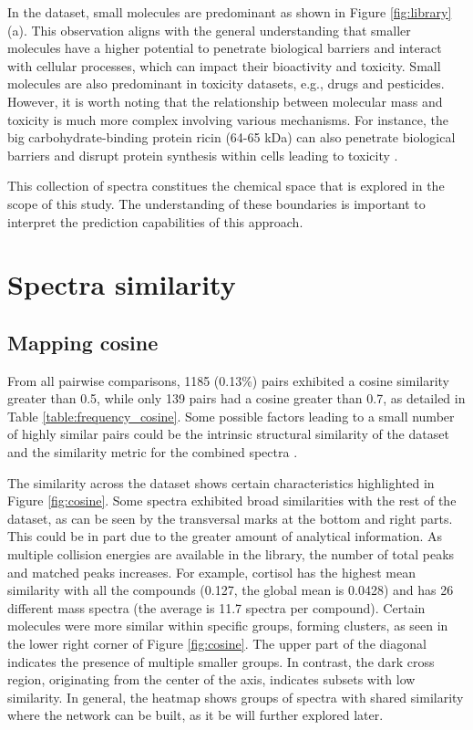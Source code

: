 In the dataset, small molecules are predominant as shown in Figure \ref{fig:library} (a). This observation aligns with the general understanding that smaller molecules have a higher potential to penetrate biological barriers and interact with cellular processes, which can impact their bioactivity and toxicity. Small molecules are also predominant in toxicity datasets, e.g., drugs and pesticides. However, it is worth noting that the relationship between molecular mass and toxicity is much more complex involving various mechanisms. For instance, the big carbohydrate-binding protein ricin (64-65 kDa) can also penetrate biological barriers and disrupt protein synthesis within cells leading to toxicity \cite{SANDVIG2000415}. 

This collection of spectra constitues the chemical space that is explored in the scope of this study. The understanding of these boundaries is important to interpret the prediction capabilities of this approach.


\section*{Spectra similarity}


\subsection*{Mapping cosine}
From all pairwise comparisons, 1185 (0.13\%) pairs exhibited a cosine similarity greater than 0.5, while only 139 pairs had a cosine greater than 0.7, as detailed in Table \ref{table:frequency_cosine}. Some possible factors leading to a small number of highly similar pairs could be the intrinsic structural similarity of the dataset and the similarity metric for the combined spectra .  

The similarity across the dataset shows certain characteristics highlighted in Figure \ref{fig:cosine}. Some spectra exhibited broad similarities with the rest of the dataset, as can be seen by the transversal marks at the bottom and right  parts. This could be in part due to the greater amount of analytical information. As multiple collision energies are available in the library, the number of total peaks and matched peaks increases. For example, cortisol has the highest mean similarity with all the compounds (0.127, the global mean is 0.0428) and has 26 different mass spectra (the average is 11.7 spectra per compound). Certain molecules were more similar within specific groups, forming clusters, as seen in the lower right corner of Figure \ref{fig:cosine}. The upper part of the diagonal indicates the presence of multiple smaller groups. In contrast, the dark cross region, originating from the center of the axis, indicates subsets with low similarity. In general, the heatmap shows groups of spectra with shared similarity where the network can be built, as it be will further explored later.

